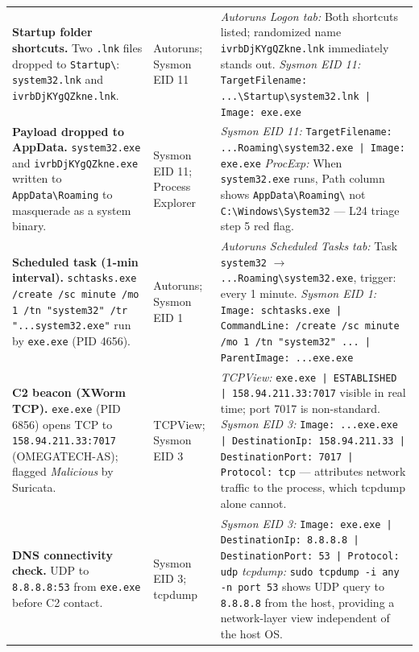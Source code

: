 \documentclass[10pt]{article}
\begin{document}
\begin{longtable}{>{\raggedright\arraybackslash}p{3.8cm}
                  >{\raggedright\arraybackslash}p{2.8cm}
                  >{\raggedright\arraybackslash}p{8.4cm}}
\rowcolor{rowgray}
\textbf{Startup folder shortcuts.}
Two \texttt{.lnk} files dropped to \texttt{Startup\textbackslash}: \texttt{system32.lnk} and \texttt{ivrbDjKYgQZkne.lnk}.
&
Autoruns; Sysmon EID 11
&
\textit{Autoruns Logon tab:} Both shortcuts listed; randomized name \texttt{ivrbDjKYgQZkne.lnk} immediately stands out.
\textit{Sysmon EID 11:} \texttt{TargetFilename: ...\textbackslash Startup\textbackslash system32.lnk | Image: exe.exe} \\
 
\textbf{Payload dropped to AppData.}
\texttt{system32.exe} and \texttt{ivrbDjKYgQZkne.exe} written to \texttt{AppData\textbackslash Roaming} to masquerade as a system binary.
&
Sysmon EID 11; Process Explorer
&
\textit{Sysmon EID 11:} \texttt{TargetFilename: ...Roaming\textbackslash system32.exe | Image: exe.exe}
\textit{ProcExp:} When \texttt{system32.exe} runs, Path column shows \texttt{AppData\textbackslash Roaming\textbackslash} not \texttt{C:\textbackslash Windows\textbackslash System32} --- L24 triage step 5 red flag. \\
 
\rowcolor{rowgray}
\textbf{Scheduled task (1-min interval).}
\texttt{schtasks.exe /create /sc minute /mo 1 /tn "system32" /tr "...system32.exe"} run by \texttt{exe.exe} (PID 4656).
&
Autoruns; Sysmon EID 1
&
\textit{Autoruns Scheduled Tasks tab:} Task \texttt{system32} $\to$ \texttt{...Roaming\textbackslash system32.exe}, trigger: every 1 minute.
\textit{Sysmon EID 1:} \texttt{Image: schtasks.exe | CommandLine: /create /sc minute /mo 1 /tn "system32" ... | ParentImage: ...exe.exe} \\
 
\textbf{C2 beacon (XWorm TCP).}
\texttt{exe.exe} (PID 6856) opens TCP to \texttt{158.94.211.33:7017} (OMEGATECH-AS); flagged \emph{Malicious} by Suricata.
&
TCPView; Sysmon EID 3
&
\textit{TCPView:} \texttt{exe.exe | ESTABLISHED | 158.94.211.33:7017} visible in real time; port 7017 is non-standard.
\textit{Sysmon EID 3:} \texttt{Image: ...exe.exe | DestinationIp: 158.94.211.33 | DestinationPort: 7017 | Protocol: tcp} --- attributes network traffic to the process, which tcpdump alone cannot. \\
 
\rowcolor{rowgray}
\textbf{DNS connectivity check.}
UDP to \texttt{8.8.8.8:53} from \texttt{exe.exe} before C2 contact.
&
Sysmon EID 3; tcpdump
&
\textit{Sysmon EID 3:} \texttt{Image: exe.exe | DestinationIp: 8.8.8.8 | DestinationPort: 53 | Protocol: udp}
\textit{tcpdump:} \texttt{sudo tcpdump -i any -n port 53} shows UDP query to \texttt{8.8.8.8} from the host, providing a network-layer view independent of the host OS. \\
 

\end{longtable}
\end{document}
